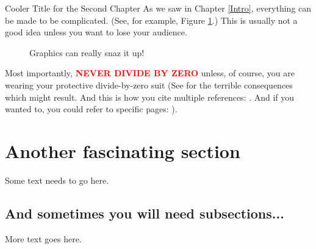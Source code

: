 \documentclass[12pt]{pom_thesis}
\theoremstyle{plain}{
\newtheorem{thm}{Theorem}[chapter]
\newtheorem{lemma}[thm]{Lemma}
\newtheorem{prop}[thm]{Proposition}
\newtheorem{cor}[thm]{Corollary}
\newtheorem{conj}[thm]{Conjecture}
}
\theoremstyle{definition}{
\newtheorem{defn}[thm]{Definition}
\newtheorem{examp}[thm]{Example}
\newtheorem{rmk}[thm]{Remark}
}\fi
\begin{document}
\begin{chapter}{Cooler Title for the Second Chapter} As we saw in Chapter \ref{Intro}, everything can be
made to be complicated. (See, for example,  Figure \ref{fig1}.) This is usually not a good idea unless you want to lose your audience.

\begin{figure}
\caption{Graphics can really snaz it up!}
\label{fig1} %
\end{figure}

Most importantly, \textcolor{red}{\bf NEVER DIVIDE BY ZERO} unless, of course, you are wearing your protective
divide-by-zero suit (See \cite{Ab80} for the terrible consequences which might result. And this is how you cite multiple references: \cite{Ab80, BlTaWe, Bo1}. And if you wanted to, you could refer to specific pages: \cite[pages 567--569]{Bo2}).

\section{Another fascinating section}

Some text needs to go here.

\subsection{And sometimes you will need subsections...}

More text goes here.
\end{chapter}
\end{document}
